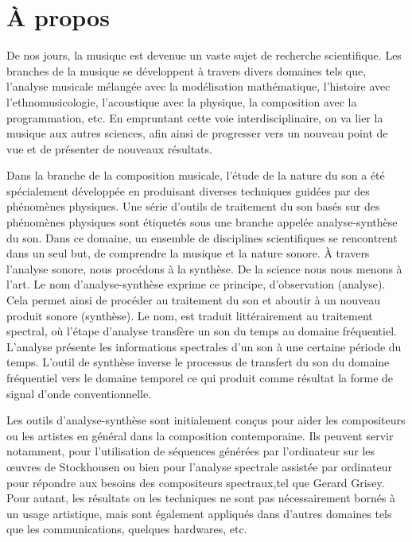 
\section{À propos}

De nos jours, la musique est devenue un vaste sujet de recherche scientifique. Les branches de la musique se développent à travers divers domaines tels que, l'analyse musicale mélangée avec la modélisation mathématique, l’histoire avec l’ethnomusicologie, l’acoustique avec la physique, la composition avec la programmation, etc. En empruntant cette voie interdisciplinaire, on va lier la musique aux autres sciences, afin ainsi de progresser vers un nouveau point de vue et de présenter de nouveaux résultats.

Dans la branche de la composition musicale, l’étude de la nature du son a été spécialement développée en produisant diverses techniques guidées par des phénomènes physiques. Une série d'outils de traitement du son basés sur des phénomènes physiques sont étiquetés sous une branche appelée analyse-synthèse du son. Dans ce domaine, un ensemble de disciplines scientifiques se rencontrent dans un seul but, de comprendre la musique et la nature sonore. À travers l’analyse sonore, nous procédons à la synthèse. De la science nous nous menons à l'art. Le nom d'analyse-synthèse exprime ce principe, d’observation (analyse). Cela permet ainsi de procéder au traitement du son et aboutir à un nouveau produit sonore (synthèse). Le nom, est traduit littérairement au traitement spectral, où l’étape d’analyse transfère un son du temps au domaine fréquentiel. L'analyse présente les informations spectrales d'un son à une certaine période du temps. L'outil de synthèse inverse le processus de transfert du son du domaine fréquentiel vers le domaine temporel ce qui produit comme résultat la forme de signal d'onde conventionnelle.

Les outils d'analyse-synthèse sont initialement conçus pour aider les compositeurs ou les artistes en général dans la composition contemporaine. Ils peuvent servir notamment, pour l'utilisation de séquences générées par l’ordinateur sur les œuvres de Stockhousen ou bien pour l’analyse spectrale assistée par ordinateur pour répondre aux besoins des compositeurs spectraux,tel que Gerard Grisey. Pour autant, les résultats ou les techniques ne sont pas nécessairement bornés à un usage artistique, mais sont également appliqués dans d'autres domaines tels que les communications, quelques hardwares, etc.

